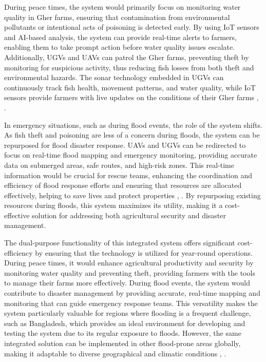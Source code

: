 \documentclass[conference]{IEEEtran}
\begin{document}
During peace times, the system would primarily focus on monitoring water quality in Gher farms, ensuring that contamination from environmental pollutants or intentional acts of poisoning is detected early. By using IoT sensors and AI-based analysis, the system can provide real-time alerts to farmers, enabling them to take prompt action before water quality issues escalate. Additionally, UGVs and UAVs can patrol the Gher farms, preventing theft by monitoring for suspicious activity, thus reducing fish losses from both theft and environmental hazards. The sonar technology embedded in UGVs can continuously track fish health, movement patterns, and water quality, while IoT sensors provide farmers with live updates on the conditions of their Gher farms \cite{ref1}, \cite{ref6}.


In emergency situations, such as during flood events, the role of the system shifts. As fish theft and poisoning are less of a concern during floods, the system can be repurposed for flood disaster response. UAVs and UGVs can be redirected to focus on real-time flood mapping and emergency monitoring, providing accurate data on submerged areas, safe routes, and high-risk zones. This real-time information would be crucial for rescue teams, enhancing the coordination and efficiency of flood response efforts and ensuring that resources are allocated effectively, helping to save lives and protect properties \cite{ref7}, \cite{ref10}. By repurposing existing resources during floods, this system maximizes its utility, making it a cost-effective solution for addressing both agricultural security and disaster management.


The dual-purpose functionality of this integrated system offers significant cost-efficiency by ensuring that the technology is utilized for year-round operations. During peace times, it would enhance agricultural productivity and security by monitoring water quality and preventing theft, providing farmers with the tools to manage their farms more effectively. During flood events, the system would contribute to disaster management by providing accurate, real-time mapping and monitoring that can guide emergency response teams. This versatility makes the system particularly valuable for regions where flooding is a frequent challenge, such as Bangladesh, which provides an ideal environment for developing and testing the system due to its regular exposure to floods. However, the same integrated solution can be implemented in other flood-prone areas globally, making it adaptable to diverse geographical and climatic conditions \cite{ref5}, \cite{ref9}.
\end{document}
